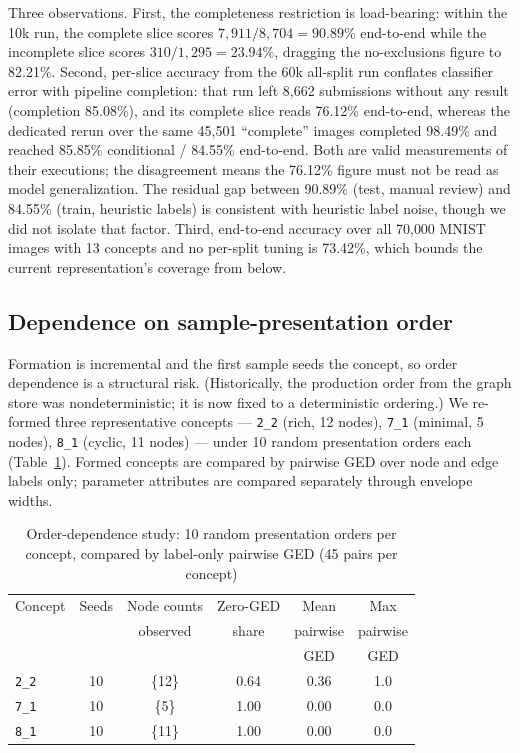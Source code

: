 \documentclass[conference]{IEEEtran}
\newcommand{\cid}[1]{\texttt{#1}}   %
\begin{document}
Three observations. First, the completeness restriction is load-bearing:
within the 10k run, the complete slice scores $7{,}911/8{,}704 = 90.89\%$
end-to-end while the incomplete slice scores $310/1{,}295 = 23.94\%$,
dragging the no-exclusions figure to 82.21\%. Second, per-slice accuracy
from the 60k all-split run conflates classifier error with pipeline
completion: that run left 8{,}662 submissions without any result
(completion 85.08\%), and its complete slice reads 76.12\% end-to-end,
whereas the dedicated rerun over the same 45{,}501 ``complete'' images
completed 98.49\% and reached 85.85\% conditional / 84.55\% end-to-end.
Both are valid measurements of their executions; the disagreement means
the 76.12\% figure must not be read as model generalization. The residual
gap between 90.89\% (test, manual review) and 84.55\% (train, heuristic
labels) is consistent with heuristic label noise, though we did not
isolate that factor. Third, end-to-end accuracy over all 70{,}000
MNIST images with 13 concepts and no per-split tuning is 73.42\%, which
bounds the current representation's coverage from below.

\subsection{Dependence on sample-presentation order}
\label{sec:order}

Formation is incremental and the first sample seeds the concept, so order
dependence is a structural risk. (Historically, the production order from
the graph store was nondeterministic; it is now fixed to a deterministic
ordering.) We re-formed three representative concepts --- \cid{2\_2} (rich,
12 nodes), \cid{7\_1} (minimal, 5 nodes), \cid{8\_1} (cyclic, 11 nodes) ---
under 10 random presentation orders each (Table~\ref{tab:order}). Formed
concepts are compared by pairwise GED over node and edge labels only;
parameter attributes are compared separately through envelope widths.

\begin{table}[!t]
\caption{Order-dependence study: 10 random presentation orders per
concept, compared by label-only pairwise GED (45 pairs per concept)}
\label{tab:order}
\centering
\begin{tabular}{lccccc}
\toprule
Concept & Seeds & Node counts & Zero-GED & Mean & Max \\
 & & observed & share & pairwise & pairwise \\
 & & & & GED & GED \\
\midrule
\cid{2\_2} & 10 & \{12\} & 0.64 & 0.36 & 1.0 \\
\cid{7\_1} & 10 & \{5\} & 1.00 & 0.00 & 0.0 \\
\cid{8\_1} & 10 & \{11\} & 1.00 & 0.00 & 0.0 \\
\bottomrule
\end{tabular}
\end{table}
\end{document}
